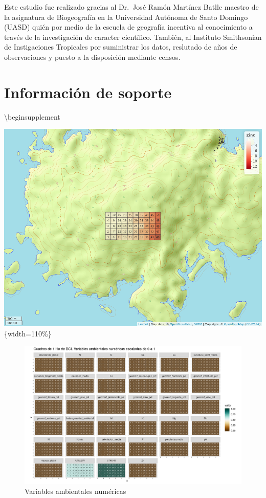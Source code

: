\documentclass[11pt,]{article}
\newenvironment{Shaded}{\begin{snugshade}}{\end{snugshade}}
\newcommand{\NormalTok}[1]{#1}
\begin{document}
Este estudio fue realizado gracias al Dr.~José Ramón Martínez Batlle
maestro de la asignatura de Biogeografía en la Universidad Autónoma de
Santo Domingo (UASD) quién por medio de la escuela de geografía
incentiva al conocimiento a través de la investigación de caracter
científico. También, al Instituto Smithsonian de Instigaciones
Tropicales por suministrar los datos, reslutado de años de observaciones
y puesto a la disposición mediante censos.

\section{Información de soporte}\label{informaciuxf3n-de-soporte}

\begin{Shaded}
\begin{Highlighting}[]
\NormalTok{\textbackslash{}beginsupplement}
\end{Highlighting}
\end{Shaded}

\includegraphics{mapa_zinc.png} \{width=110\%\}

\begin{figure}
\centering
\includegraphics[width=1.10000\textwidth]{mapas_variables_ambientales_numericas.png}
\caption{\label{fig:soporte1} Variables ambientales numéricas}
\end{figure}
\end{document}
